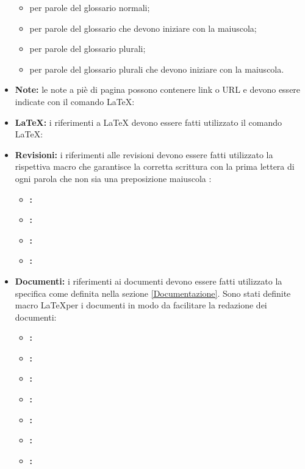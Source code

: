 \documentclass[12pt,a4paper]{article}
\begin{document}
\begin{itemize}
	\begin{itemize}
		\item {} per parole del glossario normali;
		\item {} per parole del glossario che devono iniziare con la maiuscola;
		\item {} per parole del glossario plurali;
		\item {} per parole del glossario plurali che devono iniziare con la maiuscola.
	\end{itemize}
	\item \textbf{Note:} le note a piè di pagina possono contenere link o URL e devono essere indicate con il comando \LaTeX: 
	\item \textbf{\LaTeX:} i riferimenti a \LaTeX{} devono essere fatti utilizzato il comando \LaTeX: 
	\item \textbf{Revisioni:} i riferimenti alle revisioni devono essere fatti utilizzato la rispettiva macro che garantisce la corretta scrittura con la prima lettera di ogni parola che non sia una preposizione maiuscola :
	\begin{itemize}
		\item \textbf{\RR:} 
		\item \textbf{\RP:} 
		\item \textbf{\RQ:} 
		\item \textbf{\RA:} 
	\end{itemize}
	\item \textbf{Documenti:} i riferimenti ai documenti devono essere fatti utilizzato la specifica come definita nella sezione \ref{Documentazione}. Sono stati definite macro  \LaTeX per i documenti in modo da facilitare la redazione dei documenti:
	\begin{itemize}
		\item \textbf{\NdP:} 
		\item \textbf{\SdF:} 
		\item \textbf{\AdR:} 
		\item \textbf{\PdP:} 
		\item \textbf{\PdQ:} 
		\item \textbf{\DP:} 
		\item \textbf{\ST:} 

\end{itemize}
\end{itemize}
\end{document}
